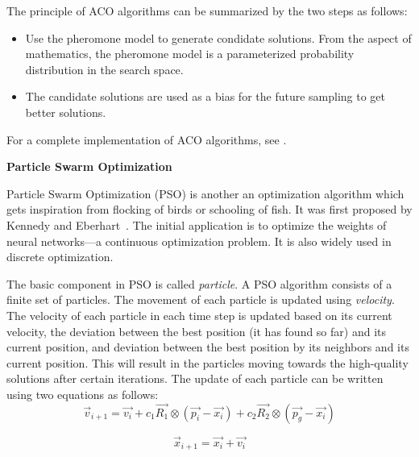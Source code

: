 The principle of ACO algorithms can be summarized by the two steps as follows:

\begin{itemize}
\item Use the pheromone model to generate condidate solutions. From the aspect of mathematics, the pheromone model is a parameterized probability distribution in the search space.

\item The candidate solutions are used as a bias for the future sampling to get better solutions.
\end{itemize}

For a complete implementation of ACO algorithms, see \cite{dorigo2008ant}. 


\textbf{Particle Swarm Optimization}

Particle Swarm Optimization (PSO) is another an optimization algorithm which gets inspiration from flocking of birds or schooling of fish. It was first proposed by Kennedy and Eberhart~\cite{Kennedy:ICNN:1995}. The initial application is to optimize the weights of neural networks---a continuous optimization problem. It is also widely used in discrete optimization. 

The basic component in PSO is called \textit{particle}. A PSO algorithm consists of a finite set of particles. The movement of each particle is updated using \textit{velocity}. The velocity of each particle in each time step is updated based on its current velocity, the deviation between the best position (it has found so far) and its current position, and deviation between the best position by its neighbors and its current position. This will result in the particles moving towards the high-quality solutions after certain iterations. The update of each particle can be written using two equations as follows:
\begin{equation}\label{eq:particle_velocity_update}
\overrightarrow{v}_{i+1} =  \overrightarrow{v_{i}} + c_1\overrightarrow{R_{1}}\otimes(\overrightarrow{p_{i}} - \overrightarrow{x_{i}}) + c_2\overrightarrow{R_{2}}\otimes(\overrightarrow{p_{g}} - \overrightarrow{x_{i}}) 
\end{equation} 

\begin{equation}\label{eq:particle_position_update}
\overrightarrow{x}_{i+1} =  \overrightarrow{x_{i}} + \overrightarrow{v_{i}}
\end{equation} 

